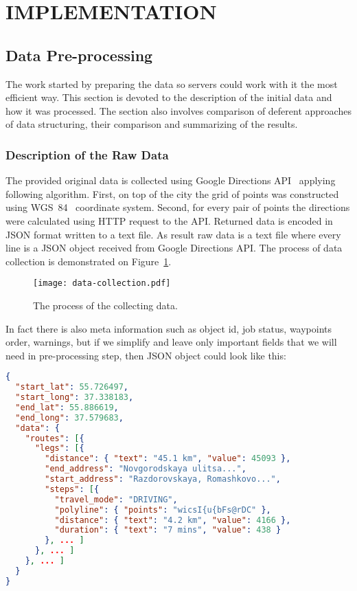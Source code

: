 
\section{IMPLEMENTATION}

\subsection{Data Pre-processing}
The work started by preparing the data so servers could work with it the most efficient way. This
section is devoted to the description of the initial data and how it was processed. The section
also involves comparison of deferent approaches of data structuring, their comparison and
summarizing of the results.

\subsubsection{Description of the Raw Data}
The provided original data is collected using Google Directions API~\cite{google:directions}
applying following algorithm. First, on top of the city the grid of points was constructed
using WGS~84~\cite{wiki:wgs} coordinate system. Second, for every pair of points the
directions were calculated using HTTP request to the API. Returned data is encoded in JSON
format written to a text file. As result raw data is a
text file where every line is a JSON object received from Google Directions API. The process
of data collection is demonstrated on Figure~\ref{pic:collecting_data}.

\begin{figure}[ht]
  \centering
  \texttt{[image: data-collection.pdf]}
  \caption{The process of the collecting data.}
  \label{pic:collecting_data}
\end{figure}

In fact there is also meta information such as object id, job status, waypoints order,
warnings, but if we simplify and leave only important fields that we will need in pre-processing
step, then JSON object could look like this:

\begin{lstlisting}[language=json, caption=Google Directions API simplified response example,
      label={lst:google_response}]
{
  "start_lat": 55.726497,
  "start_long": 37.338183,
  "end_lat": 55.886619,
  "end_long": 37.579683,
  "data": {
    "routes": [{
      "legs": [{
        "distance": { "text": "45.1 km", "value": 45093 },
        "end_address": "Novgorodskaya ulitsa...",
        "start_address": "Razdorovskaya, Romashkovo...",
        "steps": [{
          "travel_mode": "DRIVING",
          "polyline": { "points": "wicsI{u{bFs@rDC" },
          "distance": { "text": "4.2 km", "value": 4166 },
          "duration": { "text": "7 mins", "value": 438 }
        }, ... ]
      }, ... ]
    }, ... ]
  }
}
\end{lstlisting}

